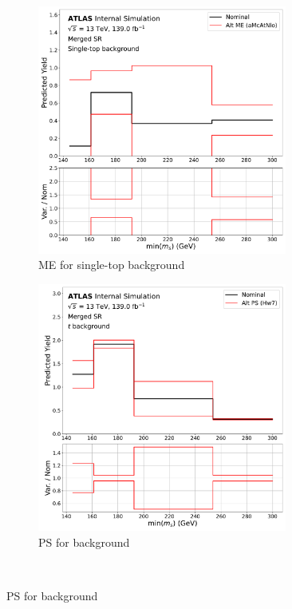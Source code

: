  \begin{figure} \ContinuedFloat
  \begin{subfigure}{0.45\textwidth}
      \centering
    \includegraphics[width=0.9\textwidth]{Figures/6/2pt_AMcPy8_syst_stop_SR_mgd_TARJets10_minmS_mgd_yield.pdf}
    \caption{ME for single-top background}\label{fig:stop_ME}
    \end{subfigure} \hspace{1em}
   \begin{subfigure}{0.45\textwidth}
       \centering
    \includegraphics[width=0.9\textwidth]{Figures/6/2pt_PhHw7_syst_ttbar_SR_mgd_TARJets10_minmS_mgd_yield.pdf}
    \caption{PS for \ttbar background}\label{fig:ttbar_PS}
  \end{subfigure} \\ \vspace{1em}


\end{figure}
